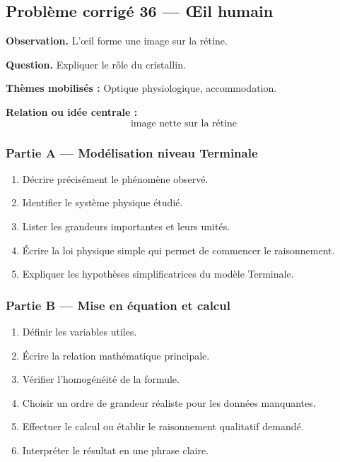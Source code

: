 \documentclass[11pt,a4paper]{article}
\begin{document}
\subsection{Problème corrigé 36 — Œil humain}

\begin{exercicebox}
\textbf{Observation.} L'œil forme une image sur la rétine.

\medskip
\textbf{Question.} Expliquer le rôle du cristallin.

\medskip
\textbf{Thèmes mobilisés :} Optique physiologique, accommodation.

\medskip
\textbf{Relation ou idée centrale :}
\[
\text{image nette sur la rétine}
\]
\end{exercicebox}

\subsubsection*{Partie A — Modélisation niveau Terminale}

\begin{enumerate}
  \item Décrire précisément le phénomène observé.
  \item Identifier le système physique étudié.
  \item Lister les grandeurs importantes et leurs unités.
  \item Écrire la loi physique simple qui permet de commencer le raisonnement.
  \item Expliquer les hypothèses simplificatrices du modèle Terminale.
\end{enumerate}

\subsubsection*{Partie B — Mise en équation et calcul}

\begin{enumerate}
  \item Définir les variables utiles.
  \item Écrire la relation mathématique principale.
  \item Vérifier l'homogénéité de la formule.
  \item Choisir un ordre de grandeur réaliste pour les données manquantes.
  \item Effectuer le calcul ou établir le raisonnement qualitatif demandé.
  \item Interpréter le résultat en une phrase claire.
\end{enumerate}
\end{document}
